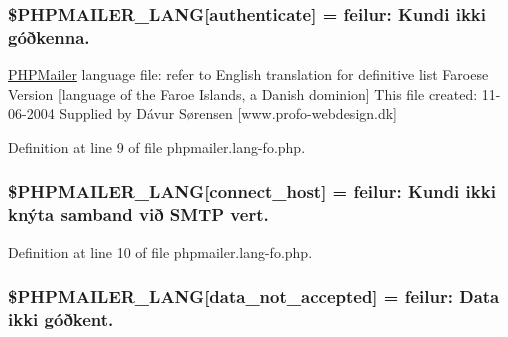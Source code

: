 \subsubsection[{\texorpdfstring{\$\+P\+H\+P\+M\+A\+I\+L\+E\+R\+\_\+\+L\+A\+NG}{$PHPMAILER_LANG}}]{\setlength{\rightskip}{0pt plus 5cm}\$P\+H\+P\+M\+A\+I\+L\+E\+R\+\_\+\+L\+A\+NG\mbox{[}\textquotesingle{}authenticate\textquotesingle{}\mbox{]} =  feilur\+: Kundi ikki góðkenna.\textquotesingle{}}\hypertarget{phpmailer_8lang-fo_8php_a2cb33073c989b85580748e331ed8b4aa}{}\label{phpmailer_8lang-fo_8php_a2cb33073c989b85580748e331ed8b4aa}
\hyperlink{class_p_h_p_mailer}{P\+H\+P\+Mailer} language file\+: refer to English translation for definitive list Faroese Version \mbox{[}language of the Faroe Islands, a Danish dominion\mbox{]} This file created\+: 11-\/06-\/2004 Supplied by Dávur Sørensen \mbox{[}www.\+profo-\/webdesign.\+dk\mbox{]} 

Definition at line 9 of file phpmailer.\+lang-\/fo.\+php.

\subsubsection[{\texorpdfstring{\$\+P\+H\+P\+M\+A\+I\+L\+E\+R\+\_\+\+L\+A\+NG}{$PHPMAILER_LANG}}]{\setlength{\rightskip}{0pt plus 5cm}\$P\+H\+P\+M\+A\+I\+L\+E\+R\+\_\+\+L\+A\+NG\mbox{[}\textquotesingle{}connect\+\_\+host\textquotesingle{}\mbox{]} =  feilur\+: Kundi ikki knýta samband við {\bf S\+M\+TP} vert.\textquotesingle{}}\hypertarget{phpmailer_8lang-fo_8php_a2ee0cc637a06b96e45600db31c6799ee}{}\label{phpmailer_8lang-fo_8php_a2ee0cc637a06b96e45600db31c6799ee}


Definition at line 10 of file phpmailer.\+lang-\/fo.\+php.

\subsubsection[{\texorpdfstring{\$\+P\+H\+P\+M\+A\+I\+L\+E\+R\+\_\+\+L\+A\+NG}{$PHPMAILER_LANG}}]{\setlength{\rightskip}{0pt plus 5cm}\$P\+H\+P\+M\+A\+I\+L\+E\+R\+\_\+\+L\+A\+NG\mbox{[}\textquotesingle{}data\+\_\+not\+\_\+accepted\textquotesingle{}\mbox{]} =  feilur\+: Data ikki góðkent.\textquotesingle{}}\hypertarget{phpmailer_8lang-fo_8php_a814c6b191205d2361b3233e9c9d6fda5}{}\label{phpmailer_8lang-fo_8php_a814c6b191205d2361b3233e9c9d6fda5}


